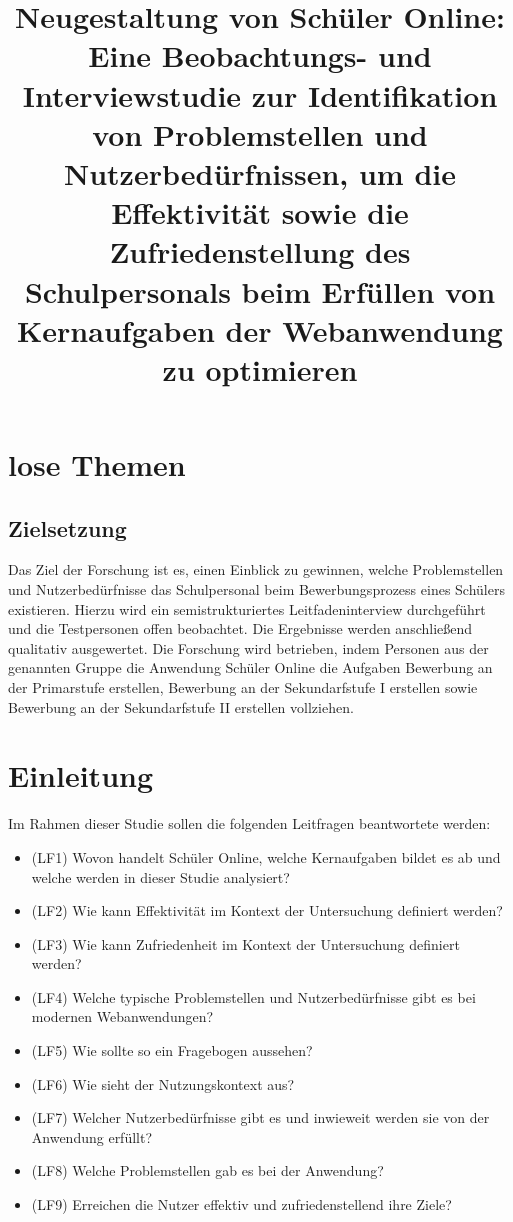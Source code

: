 \section{lose Themen}
\subsection{Zielsetzung}
Das Ziel der Forschung ist es, einen Einblick zu gewinnen, welche Problemstellen und Nutzerbedürfnisse das Schulpersonal beim Bewerbungsprozess eines Schülers existieren. Hierzu wird ein semistrukturiertes Leitfadeninterview durchgeführt und die Testpersonen offen beobachtet. Die Ergebnisse werden anschließend qualitativ ausgewertet. Die Forschung wird betrieben, indem Personen aus der genannten Gruppe die Anwendung Schüler Online die Aufgaben \glqq Bewerbung an der Primarstufe erstellen\grqq{}, \glqq Bewerbung an der Sekundarfstufe I erstellen\grqq{} sowie \glqq Bewerbung an der Sekundarfstufe II erstellen\grqq{} vollziehen. 


\title{Neugestaltung von Schüler Online: Eine Beobachtungs- und Interviewstudie zur Identifikation von Problemstellen und Nutzerbedürfnissen, um die Effektivität sowie die Zufriedenstellung des Schulpersonals beim Erfüllen von Kernaufgaben der Webanwendung zu optimieren}

\section{Einleitung}
Im Rahmen dieser Studie sollen die folgenden Leitfragen beantwortete werden: 
\begin{itemize}
    \item (LF1) Wovon handelt Schüler Online, welche Kernaufgaben bildet es ab und welche werden in dieser Studie analysiert? %
    \item (LF2) Wie kann Effektivität im Kontext der Untersuchung definiert werden? %
    \item (LF3) Wie kann Zufriedenheit im Kontext der Untersuchung definiert werden? %
    \item (LF4) Welche typische Problemstellen und Nutzerbedürfnisse gibt es bei modernen Webanwendungen? %
    \item (LF5) Wie sollte so ein Fragebogen aussehen? %
    \item (LF6) Wie sieht der Nutzungskontext aus? %
    \item (LF7) Welcher Nutzerbedürfnisse gibt es und inwieweit werden sie von der Anwendung erfüllt? %
    \item (LF8) Welche Problemstellen gab es bei der Anwendung? %
    \item (LF9) Erreichen die Nutzer effektiv und zufriedenstellend ihre Ziele? %
\end{itemize}

